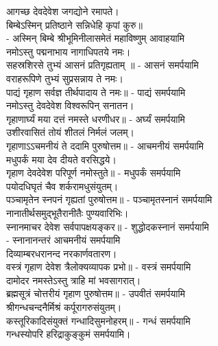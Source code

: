 आगच्छ देवदेवेश जगद्योने रमापते।\\
बिम्बेऽस्मिन् प्रतिष्ठाने सन्निधेहि कृपां कुरु॥\\
- अस्मिन् बिम्बे श्रीभूमिनीलासमेतं महाविष्णुम् आवाहयामि\\

नमोऽस्तु पद्मनाभाय नागाधिपतये नमः।\\
सहस्रशिरसे तुभ्यं आसनं प्रतिगृह्यताम् ॥ - आसनं समर्पयामि\\

वराहरूपिणे तुभ्यं सुप्रसन्नाय ते नमः।\\
पाद्यं गृहाण सर्वज्ञ तीर्थपादाय ते नमः॥ - पाद्यं समर्पयामि\\
 
नमोऽस्तु देवदेवेश विश्वरूपिन् सनातन।\\
गृहाणार्घ्यं मया दत्तं नमस्ते धरणीधर॥ - अर्घ्यं समर्पयामि\\

उशीरवासितं तोयं शीतलं निर्मलं जलम्।\\
गृहाणाऽऽचमनीयं ते ददामि पुरुषोत्तम॥ - आचमनीयं समर्पयामि\\

मधुपर्कं मया देव दीयते वरसिद्धये।\\
गृहाण देवदेवेश परिपूर्ण नमोस्तुते॥ - मधुपर्कं समर्पयामि\\

पयोदधिघृतं चैव शर्करामधुसंयुतम्।\\
पञ्चामृतेन स्नपनं गृह्यतां पुरुषोत्तम॥ - पञ्चामृतस्नानं समर्पयामि\\

नानातीर्थसमुद्भूतैरानीतैः पुण्यवारिभिः। \\
स्नानमाचर देवेश सर्वपापक्षयङ्कर॥ - शुद्धोदकस्नानं समर्पयामि\\
- स्नानानन्तरं आचमनीयं समर्पयामि\\

दिव्याम्बरधरानन्द नरकार्णवतारण।\\
वस्त्रं गृहाण देवेश त्रैलोक्यव्यापक प्रभो॥ - वस्त्रं समर्पयामि\\

दामोदर नमस्तेऽस्तु त्राहि मां भवसागरात्।\\
ब्रह्मसूत्रं चोत्तरीयं गृहाण पुरुषोत्तम॥ - उपवीतं समर्पयामि\\

श्रीगन्धचन्दनैर्मिश्रं कर्पूरागरुसंयुतम्। \\
कस्तूरिकादिसंयुक्तं गन्धादिसुमनोहरम्॥ - गन्धं समर्पयामि\\
गन्धस्योपरि हरिद्राकुङ्कुमं समर्पयामि।\\

